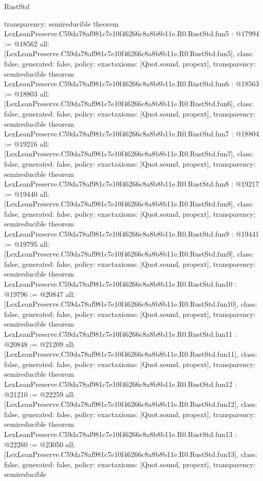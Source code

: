 \begin{lexlean}{RustStd}
\begin{coremodule}
{  transparency: semireducible
}
theorem LexLeanPreserve.C59da78af981c7e10f46266c8a8b8b11e.R0.RustStd.fun5 : @17994 := @18562 {
  all: [LexLeanPreserve.C59da78af981c7e10f46266c8a8b8b11e.R0.RustStd.fun5],
  class: false,
  generated: false,
  policy: exact{axioms: [Quot.sound, propext]},
  transparency: semireducible
}
theorem LexLeanPreserve.C59da78af981c7e10f46266c8a8b8b11e.R0.RustStd.fun6 : @18563 := @18803 {
  all: [LexLeanPreserve.C59da78af981c7e10f46266c8a8b8b11e.R0.RustStd.fun6],
  class: false,
  generated: false,
  policy: exact{axioms: [Quot.sound, propext]},
  transparency: semireducible
}
theorem LexLeanPreserve.C59da78af981c7e10f46266c8a8b8b11e.R0.RustStd.fun7 : @18804 := @19216 {
  all: [LexLeanPreserve.C59da78af981c7e10f46266c8a8b8b11e.R0.RustStd.fun7],
  class: false,
  generated: false,
  policy: exact{axioms: [Quot.sound, propext]},
  transparency: semireducible
}
theorem LexLeanPreserve.C59da78af981c7e10f46266c8a8b8b11e.R0.RustStd.fun8 : @19217 := @19440 {
  all: [LexLeanPreserve.C59da78af981c7e10f46266c8a8b8b11e.R0.RustStd.fun8],
  class: false,
  generated: false,
  policy: exact{axioms: [Quot.sound, propext]},
  transparency: semireducible
}
theorem LexLeanPreserve.C59da78af981c7e10f46266c8a8b8b11e.R0.RustStd.fun9 : @19441 := @19795 {
  all: [LexLeanPreserve.C59da78af981c7e10f46266c8a8b8b11e.R0.RustStd.fun9],
  class: false,
  generated: false,
  policy: exact{axioms: [Quot.sound, propext]},
  transparency: semireducible
}
theorem LexLeanPreserve.C59da78af981c7e10f46266c8a8b8b11e.R0.RustStd.fun10 : @19796 := @20847 {
  all: [LexLeanPreserve.C59da78af981c7e10f46266c8a8b8b11e.R0.RustStd.fun10],
  class: false,
  generated: false,
  policy: exact{axioms: [Quot.sound, propext]},
  transparency: semireducible
}
theorem LexLeanPreserve.C59da78af981c7e10f46266c8a8b8b11e.R0.RustStd.fun11 : @20848 := @21209 {
  all: [LexLeanPreserve.C59da78af981c7e10f46266c8a8b8b11e.R0.RustStd.fun11],
  class: false,
  generated: false,
  policy: exact{axioms: [Quot.sound, propext]},
  transparency: semireducible
}
theorem LexLeanPreserve.C59da78af981c7e10f46266c8a8b8b11e.R0.RustStd.fun12 : @21210 := @22259 {
  all: [LexLeanPreserve.C59da78af981c7e10f46266c8a8b8b11e.R0.RustStd.fun12],
  class: false,
  generated: false,
  policy: exact{axioms: [Quot.sound, propext]},
  transparency: semireducible
}
theorem LexLeanPreserve.C59da78af981c7e10f46266c8a8b8b11e.R0.RustStd.fun13 : @22260 := @23050 {
  all: [LexLeanPreserve.C59da78af981c7e10f46266c8a8b8b11e.R0.RustStd.fun13],
  class: false,
  generated: false,
  policy: exact{axioms: [Quot.sound, propext]},
  transparency: semireducible
}
\end{coremodule}
\end{lexlean}
